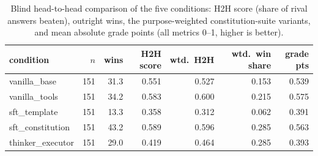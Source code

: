 \begin{table}[t]
  \centering
  \caption{Blind head-to-head comparison of the five conditions: H2H score (share of rival answers beaten), outright wins, the purpose-weighted constitution-suite variants, and mean absolute grade points (all metrics 0--1, higher is better).}
  \label{tab:rank-overall}
  \begin{tabular}{lrrrrrr}
    \toprule
    condition & $n$ & wins & H2H score & wtd.\ H2H & wtd.\ win share & grade pts \\
    \midrule
    vanilla\_base & 151 & 31.3 & 0.551 & 0.527 & 0.153 & 0.539 \\
    vanilla\_tools & 151 & 34.2 & 0.583 & 0.600 & 0.215 & 0.575 \\
    sft\_template & 151 & 13.3 & 0.358 & 0.312 & 0.062 & 0.391 \\
    sft\_constitution & 151 & 43.2 & 0.589 & 0.596 & 0.285 & 0.563 \\
    thinker\_executor & 151 & 29.0 & 0.419 & 0.464 & 0.285 & 0.393 \\
    \bottomrule
  \end{tabular}
\end{table}

